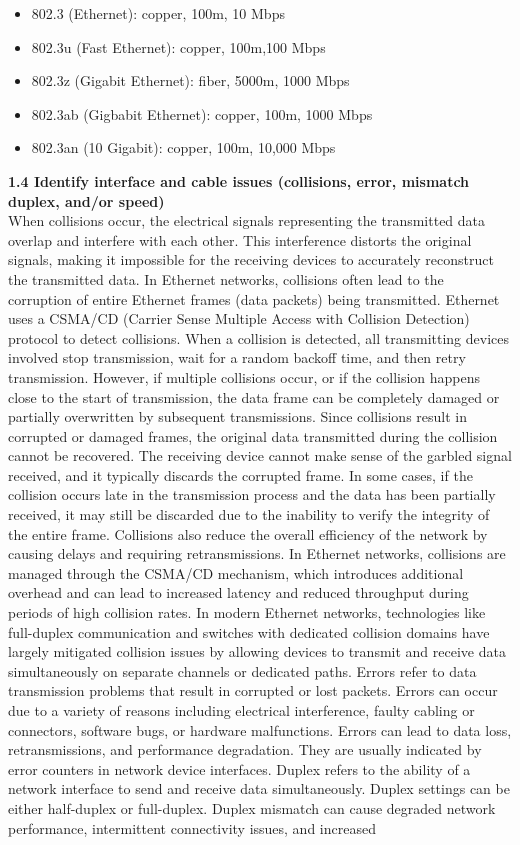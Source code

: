 \documentclass{article}
\begin{document}
\begin{itemize}
\item802.3 (Ethernet): copper, 100m, 10 Mbps\\
\item802.3u (Fast Ethernet): copper, 100m,100 Mbps\\
\item802.3z (Gigabit Ethernet): fiber, 5000m, 1000 Mbps\\
\item802.3ab (Gigbabit Ethernet): copper, 100m, 1000 Mbps\\
\item802.3an (10 Gigabit): copper, 100m, 10,000 Mbps\\
\end{itemize}
	
\textbf{1.4 Identify interface and cable issues (collisions, error, mismatch duplex, and/or speed)}\\

	When collisions occur, the electrical signals representing the transmitted data overlap and interfere with each other. This interference distorts the original signals, making it impossible for the receiving devices to accurately reconstruct the transmitted data. In Ethernet networks, collisions often lead to the corruption of entire Ethernet frames (data packets) being transmitted. Ethernet uses a CSMA/CD (Carrier Sense Multiple Access with Collision Detection) protocol to detect collisions. When a collision is detected, all transmitting devices involved stop transmission, wait for a random backoff time, and then retry transmission. However, if multiple collisions occur, or if the collision happens close to the start of transmission, the data frame can be completely damaged or partially overwritten by subsequent transmissions. Since collisions result in corrupted or damaged frames, the original data transmitted during the collision cannot be recovered. The receiving device cannot make sense of the garbled signal received, and it typically discards the corrupted frame. In some cases, if the collision occurs late in the transmission process and the data has been partially received, it may still be discarded due to the inability to verify the integrity of the entire frame. Collisions also reduce the overall efficiency of the network by causing delays and requiring retransmissions. In Ethernet networks, collisions are managed through the CSMA/CD mechanism, which introduces additional overhead and can lead to increased latency and reduced throughput during periods of high collision rates. In modern Ethernet networks, technologies like full-duplex communication and switches with dedicated collision domains have largely mitigated collision issues by allowing devices to transmit and receive data simultaneously on separate channels or dedicated paths. Errors refer to data transmission problems that result in corrupted or lost packets. Errors can occur due to a variety of reasons including electrical interference, faulty cabling or connectors, software bugs, or hardware malfunctions. Errors can lead to data loss, retransmissions, and performance degradation. They are usually indicated by error counters in network device interfaces. Duplex refers to the ability of a network interface to send and receive data simultaneously. Duplex settings can be either half-duplex or full-duplex. Duplex mismatch can cause degraded network performance, intermittent connectivity issues, and increased 
\end{document}
